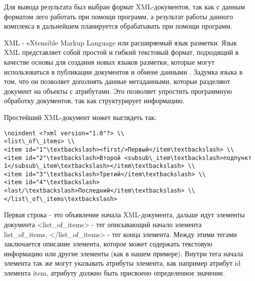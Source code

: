 Для вывода результата был выбран формат XML-документов, так как с данным форматом лего работать при помощи программ, а результат работы данного комплекса в дальнейшем планируется обрабатывать при помощи программ.

XML - eXtensible Markup Language или расширяемый язык разметки. Язык XML представляет собой простой и гибкий текстовый формат, подходящий в качестве основы для создания новых языков разметки, которые могут использоваться в публикации документов и обмене данными \cite{xml}. Задумка языка в том, что он позволяет дополнять данные метаданными, которые разделяют документ на объекты с атрибутами. Это позволяет упростить программную обработку документов, так как структурирует информацию.

Простейший XML-документ может выглядеть так:


\begin{lstlisting}
\noindent <?xml version="1.0"?> \\
<list\_of\_items> \\
<item id="1"\textbackslash><first/>Первый</item\textbackslash> \\
<item id="2"\textbackslash>Второй <subsub\_item\textbackslash>подпункт 1</subsub\_item\textbackslash></item\textbackslash> \\
<item id="3"\textbackslash>Третий</item\textbackslash> \\
<item id="4"\textbackslash><last/\textbackslash>Последний</item\textbackslash> \\
</list\_of\_items\textbackslash>
\end{lstlisting}


Первая строка - это объявление начала XML-документа, дальше идут элементы документа <list\_of\_items> - тег описывающий начало элемента \\list\_of\_items, </list\_of\_items> - тег конца элемента. Между этими тегами заключается описание элемента, которое может содержать текстовую информацию или другие элементы (как в нашем примере). Внутри тега начала элемента так же могут указывать атрибуты элемента, как например атрибут id элемента item, атрибуту должно быть присвоено определенное значение.
